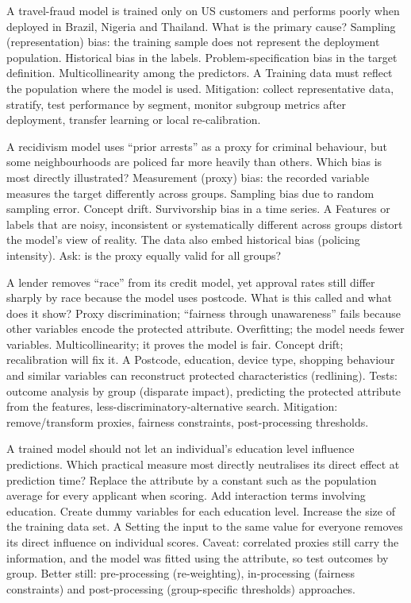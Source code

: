{A travel-fraud model is trained only on US customers and performs poorly when deployed in Brazil, Nigeria and Thailand. What is the primary cause?}
{Sampling (representation) bias: the training sample does not represent the deployment population.}
{Historical bias in the labels.}
{Problem-specification bias in the target definition.}
{Multicollinearity among the predictors.}
{A}
{Training data must reflect the population where the model is used. Mitigation: collect representative data, stratify, test performance by segment, monitor subgroup metrics after deployment, transfer learning or local re-calibration.}

{A recidivism model uses ``prior arrests'' as a proxy for criminal behaviour, but some neighbourhoods are policed far more heavily than others. Which bias is most directly illustrated?}
{Measurement (proxy) bias: the recorded variable measures the target differently across groups.}
{Sampling bias due to random sampling error.}
{Concept drift.}
{Survivorship bias in a time series.}
{A}
{Features or labels that are noisy, inconsistent or systematically different across groups distort the model's view of reality. The data also embed historical bias (policing intensity). Ask: is the proxy equally valid for all groups?}

{A lender removes ``race'' from its credit model, yet approval rates still differ sharply by race because the model uses postcode. What is this called and what does it show?}
{Proxy discrimination; ``fairness through unawareness'' fails because other variables encode the protected attribute.}
{Overfitting; the model needs fewer variables.}
{Multicollinearity; it proves the model is fair.}
{Concept drift; recalibration will fix it.}
{A}
{Postcode, education, device type, shopping behaviour and similar variables can reconstruct protected characteristics (redlining). Tests: outcome analysis by group (disparate impact), predicting the protected attribute from the features, less-discriminatory-alternative search. Mitigation: remove/transform proxies, fairness constraints, post-processing thresholds.}

{A trained model should not let an individual's education level influence predictions. Which practical measure most directly neutralises its direct effect at prediction time?}
{Replace the attribute by a constant such as the population average for every applicant when scoring.}
{Add interaction terms involving education.}
{Create dummy variables for each education level.}
{Increase the size of the training data set.}
{A}
{Setting the input to the same value for everyone removes its direct influence on individual scores. Caveat: correlated proxies still carry the information, and the model was fitted using the attribute, so test outcomes by group. Better still: pre-processing (re-weighting), in-processing (fairness constraints) and post-processing (group-specific thresholds) approaches.}

